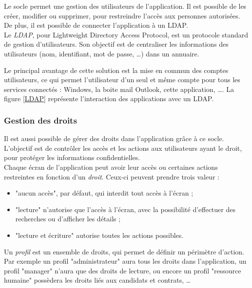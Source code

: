 Le socle permet une gestion des utilisateurs de l'application. Il est possible de les créer, modifier ou supprimer, pour restreindre l'accès aux personnes autorisées. De plus, il est possible de connecter l'application à un LDAP.
\\

Le \textit{LDAP}, pour Lightweight Directory Access Protocol, est un protocole standard de gestion d'utilisateurs. Son objectif est de centraliser les informations des utilisateurs (nom, identifiant, mot de passe, \ldots) dans un annuaire.

Le principal avantage de cette solution est la mise en commun des comptes utilisateurs, ce qui permet l'utilisateur d'un seul et même compte pour tous les services connectés : Windows, la boite mail Outlook, cette application, \ldots. La figure \ref{LDAP} représente l'interaction des applications avec un LDAP.


\subsubsection{Gestion des droits}

Il est aussi possible de gérer des droits dans l'application grâce à ce socle. L'objectif est de contrôler les accès et les actions aux utilisateurs ayant le droit, pour protéger les informations confidentielles.
\\

Chaque écran de l'application peut avoir leur accès ou certaines actions restreintes en fonction d'un \textit{droit}. Ceux-ci peuvent prendre trois valeur : 
\begin{itemize}
	\item "aucun accès", par défaut, qui interdit tout accès à l'écran ;
	\item "lecture" n'autorise que l'accès à l'écran, avec la possibilité d'effectuer des recherches ou d'afficher les détails ;
	\item "lecture et écriture" autorise toutes les actions possibles.
\end{itemize}

Un \textit{profil} est un ensemble de droits, qui permet de définir un périmètre d'action. Par exemple un profil "administrateur" aura tous les droits dans l'application, un profil "manager" n'aura que des droits de lecture, ou encore un profil "ressource humaine" possèdera les droits liés aux candidats et contrats, \ldots

